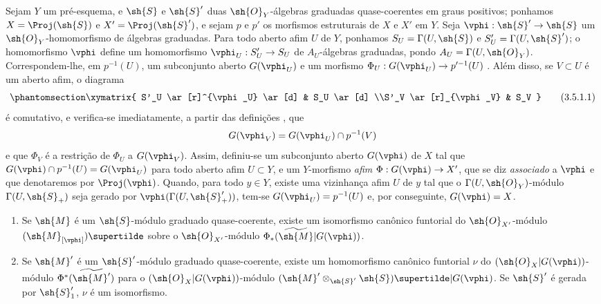 \documentclass[oneside,10pt]{amsart}
\makeatletter
\newcommand{\ega@arrow}[2]{\mathchoice{#1}{#2}{#2}{#2}}
\renewcommand{\to}{\ega@arrow{\longrightarrow}{\rightarrow}}
\newcommand{\oldpage}[2][]{\marginnote{\normalfont\footnotesize\textbf{#1}~|~#2}\ignorespaces}
\let\EGAOriginalLabel\label
\renewcommand{\label}[1]{\phantomsection\EGAOriginalLabel{#1}}
\makeatother
\begin{document}
\begin{env}[3.5.1]
\label{II.3.5.1}
Sejam $Y$ um pré-esquema, e $\sh{S}$ e $\sh{S}'$ duas $\sh{O}_Y$-álgebras graduadas quase-coerentes em graus positivos;
ponhamos $X=\Proj(\sh{S})$ e $X'=\Proj(\sh{S}')$, e sejam $p$ e $p'$ os morfismos estruturais de $X$ e $X'$ em $Y$.
Seja $\vphi:\sh{S}'\to\sh{S}$ um $\sh{O}_Y$-homomorfismo de álgebras graduadas.
Para todo aberto afim $U$ de $Y$, ponhamos $S_U=\Gamma(U,\sh{S})$ e $S'_U=\Gamma(U,\sh{S}')$;
o homomorfismo $\vphi$ define um homomorfismo $\vphi_U:S'_U\to S_U$ de $A_U$-álgebras graduadas, pondo $A_U=\Gamma(U,\sh{O}_Y)$.
Correspondem-lhe, em $p^{-1}(U)$, um subconjunto aberto $G(\vphi_U)$ e um morfismo $\Phi_U:G(\vphi_U)\to p'^{-1}(U)$ .
Além disso, se $V\subset U$ é um aberto afim, o diagrama
\[
\label{II.3.5.1.1}
  \xymatrix{
    S'_U \ar[r]^{\vphi_U} \ar[d]
    & S_U \ar[d]
  \\S'_V \ar[r]_{\vphi_V}
    & S_V
  }
\tag{3.5.1.1}
\]
é comutativo, e verifica-se imediatamente, a partir das definições , que
\[
  G(\vphi_V)=G(\vphi_U)\cap p^{-1}(V)
\]
e que $\Phi_V$ é a restrição de $\Phi_U$ a $G(\vphi_V)$.
Assim, definiu-se um subconjunto aberto $G(\vphi)$ de $X$ tal que $G(\vphi)\cap p^{-1}(U)=G(\vphi_U)$ para todo aberto afim $U\subset Y$, e um $Y$-morfismo
\oldpage[II]{62}
\emph{afim} $\Phi:G(\vphi)\to X'$, que se diz \emph{associado} a $\vphi$ e que denotaremos por $\Proj(\vphi)$.
Quando, para todo $y\in Y$, existe uma vizinhança afim $U$ de $y$ tal que o $\Gamma(U,\sh{O}_Y)$-módulo $\Gamma(U,\sh{S}_+)$ seja gerado por $\vphi(\Gamma(U,\sh{S}'_+))$, tem-se $G(\vphi_U)=p^{-1}(U)$ e, por conseguinte, $G(\vphi)=X$.
\end{env}

\begin{proposition}[3.5.2]
\label{II.3.5.2}
\medskip\noindent
\begin{enumerate}
  \item[(i)] Se $\sh{M}$ é um $\sh{S}$-módulo graduado quase-coerente, existe um isomorfismo canônico funtorial do $\sh{O}_{X'}$-módulo $(\sh{M}_{[\vphi]})\supertilde$ sobre o $\sh{O}_{X'}$-módulo $\Phi_*(\widetilde{\sh{M}}|G(\vphi))$.
  \item[(ii)] Se $\sh{M}'$ é um $\sh{S}'$-módulo graduado quase-coerente, existe um homomorfismo canônico funtorial $\nu$ do $(\sh{O}_X|G(\vphi))$-módulo $\Phi^*(\widetilde{\sh{M}'})$ para o $(\sh{O}_X|G(\vphi))$-módulo $(\sh{M}'\otimes_{\sh{S}'}\sh{S})\supertilde|G(\vphi)$.
    Se $\sh{S}'$ é gerada por $\sh{S}'_1$, $\nu$ é um isomorfismo.
\end{enumerate}
\end{proposition}
\end{document}
